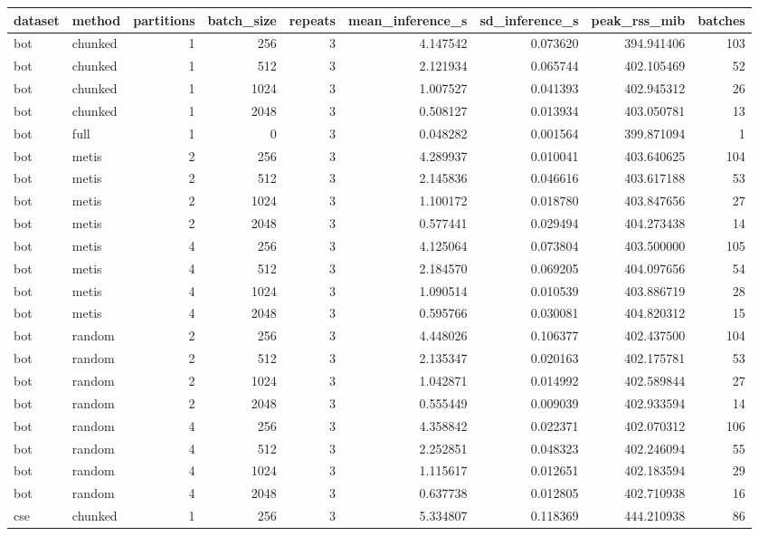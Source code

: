 \begin{tabular}{llrrrrrrr}
\toprule
dataset & method & partitions & batch\_size & repeats & mean\_inference\_s & sd\_inference\_s & peak\_rss\_mib & batches \\
\midrule
bot & chunked & 1 & 256 & 3 & 4.147542 & 0.073620 & 394.941406 & 103 \\
bot & chunked & 1 & 512 & 3 & 2.121934 & 0.065744 & 402.105469 & 52 \\
bot & chunked & 1 & 1024 & 3 & 1.007527 & 0.041393 & 402.945312 & 26 \\
bot & chunked & 1 & 2048 & 3 & 0.508127 & 0.013934 & 403.050781 & 13 \\
bot & full & 1 & 0 & 3 & 0.048282 & 0.001564 & 399.871094 & 1 \\
bot & metis & 2 & 256 & 3 & 4.289937 & 0.010041 & 403.640625 & 104 \\
bot & metis & 2 & 512 & 3 & 2.145836 & 0.046616 & 403.617188 & 53 \\
bot & metis & 2 & 1024 & 3 & 1.100172 & 0.018780 & 403.847656 & 27 \\
bot & metis & 2 & 2048 & 3 & 0.577441 & 0.029494 & 404.273438 & 14 \\
bot & metis & 4 & 256 & 3 & 4.125064 & 0.073804 & 403.500000 & 105 \\
bot & metis & 4 & 512 & 3 & 2.184570 & 0.069205 & 404.097656 & 54 \\
bot & metis & 4 & 1024 & 3 & 1.090514 & 0.010539 & 403.886719 & 28 \\
bot & metis & 4 & 2048 & 3 & 0.595766 & 0.030081 & 404.820312 & 15 \\
bot & random & 2 & 256 & 3 & 4.448026 & 0.106377 & 402.437500 & 104 \\
bot & random & 2 & 512 & 3 & 2.135347 & 0.020163 & 402.175781 & 53 \\
bot & random & 2 & 1024 & 3 & 1.042871 & 0.014992 & 402.589844 & 27 \\
bot & random & 2 & 2048 & 3 & 0.555449 & 0.009039 & 402.933594 & 14 \\
bot & random & 4 & 256 & 3 & 4.358842 & 0.022371 & 402.070312 & 106 \\
bot & random & 4 & 512 & 3 & 2.252851 & 0.048323 & 402.246094 & 55 \\
bot & random & 4 & 1024 & 3 & 1.115617 & 0.012651 & 402.183594 & 29 \\
bot & random & 4 & 2048 & 3 & 0.637738 & 0.012805 & 402.710938 & 16 \\
cse & chunked & 1 & 256 & 3 & 5.334807 & 0.118369 & 444.210938 & 86 \\

\end{tabular}
